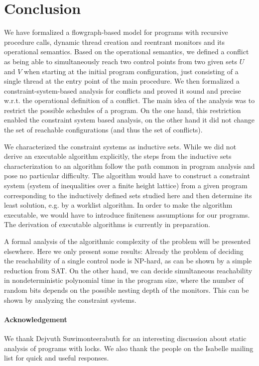\documentclass[11pt,a4paper]{article}
\begin{document}


\section{Conclusion}
We have formalized a flowgraph-based model for programs with recursive procedure calls, dynamic thread creation and reentrant monitors and its operational semantics. Based on the operational semantics, we 
defined a conflict as being able to simultaneously reach two control points from two given sets $U$ and $V$ when starting at the initial program configuration, just consisting of a single thread at the
entry point of the main procedure. We then formalized a constraint-system-based analysis for conflicts and proved it sound and precise w.r.t. the operational definition of a conflict. The main idea of the analysis
was to restrict the possible schedules of a program. On the one hand, this restriction enabled the constraint system based analysis, on the other hand it did not change the set of reachable configurations (and 
thus the set of conflicts).  

We characterized the constraint systems as inductive sets. While we did not derive an executable algorithm explicitly, the steps from the inductive sets characterization to an algorithm follow the path common in program analysis
and pose no particular difficulty. The algorithm would have to construct a constraint system (system of inequalities over a finite height lattice) from a given program corresponding to the inductively defined sets studied here and 
then determine its least solution, e.g. by a worklist algorithm. In order to make the algorithm executable, we would have to introduce finiteness assumptions for our programs. The derivation of executable algorithms is 
currently in preparation.

A formal analysis of the algorithmic complexity of the problem will be presented elsewhere. Here we only present some results: Already the problem of deciding the reachability of a single control node is NP-hard, 
as can be shown by a simple reduction from SAT. On the other hand, we can decide simultaneous reachability in nondeterministic polynomial time in the program size, where the number of random bits depends on the 
possible nesting depth of the monitors. This can be shown by analyzing the constraint systems.

\paragraph{Acknowledgement} We thank Dejvuth Suwimonteerabuth for an interesting discussion about static analysis of programs with locks. We also thank the people on the Isabelle mailing list for quick and useful responses.



\end{document}
